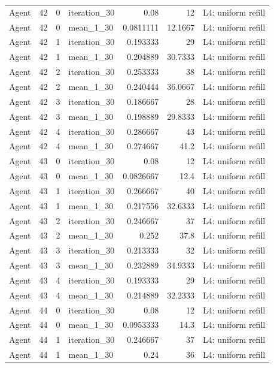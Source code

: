 \begin{table}[htbp!]
\begin{tabular}{lrrlrrl}
Agent & 42 & 0 & iteration\_30 & 0.08 & 12 & L4: uniform refill \\
Agent & 42 & 0 & mean\_1\_30 & 0.0811111 & 12.1667 & L4: uniform refill \\
Agent & 42 & 1 & iteration\_30 & 0.193333 & 29 & L4: uniform refill \\
Agent & 42 & 1 & mean\_1\_30 & 0.204889 & 30.7333 & L4: uniform refill \\
Agent & 42 & 2 & iteration\_30 & 0.253333 & 38 & L4: uniform refill \\
Agent & 42 & 2 & mean\_1\_30 & 0.240444 & 36.0667 & L4: uniform refill \\
Agent & 42 & 3 & iteration\_30 & 0.186667 & 28 & L4: uniform refill \\
Agent & 42 & 3 & mean\_1\_30 & 0.198889 & 29.8333 & L4: uniform refill \\
Agent & 42 & 4 & iteration\_30 & 0.286667 & 43 & L4: uniform refill \\
Agent & 42 & 4 & mean\_1\_30 & 0.274667 & 41.2 & L4: uniform refill \\
Agent & 43 & 0 & iteration\_30 & 0.08 & 12 & L4: uniform refill \\
Agent & 43 & 0 & mean\_1\_30 & 0.0826667 & 12.4 & L4: uniform refill \\
Agent & 43 & 1 & iteration\_30 & 0.266667 & 40 & L4: uniform refill \\
Agent & 43 & 1 & mean\_1\_30 & 0.217556 & 32.6333 & L4: uniform refill \\
Agent & 43 & 2 & iteration\_30 & 0.246667 & 37 & L4: uniform refill \\
Agent & 43 & 2 & mean\_1\_30 & 0.252 & 37.8 & L4: uniform refill \\
Agent & 43 & 3 & iteration\_30 & 0.213333 & 32 & L4: uniform refill \\
Agent & 43 & 3 & mean\_1\_30 & 0.232889 & 34.9333 & L4: uniform refill \\
Agent & 43 & 4 & iteration\_30 & 0.193333 & 29 & L4: uniform refill \\
Agent & 43 & 4 & mean\_1\_30 & 0.214889 & 32.2333 & L4: uniform refill \\
Agent & 44 & 0 & iteration\_30 & 0.08 & 12 & L4: uniform refill \\
Agent & 44 & 0 & mean\_1\_30 & 0.0953333 & 14.3 & L4: uniform refill \\
Agent & 44 & 1 & iteration\_30 & 0.246667 & 37 & L4: uniform refill \\
Agent & 44 & 1 & mean\_1\_30 & 0.24 & 36 & L4: uniform refill \\

\end{tabular}
\end{table}
